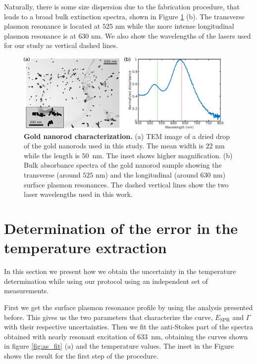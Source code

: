 \documentclass[journal=nalefd,manuscript=letter]{achemso}
\newcommand{\nm}{\ensuremath{\,\textrm{nm}}}
\begin{document}
Naturally, there is some size dispersion due to the fabrication procedure, that leads to a broad bulk extinction 
spectra, shown in Figure \ref{fg:nr-char} (b). The transverse plasmon resonance is located at 
$525$ nm while the more intense longitudinal plasmon resonance is at $630$ nm. We also show 
the wavelengths of the lasers used for our study as vertical dashed lines. 

\begin{figure}[htp] \centering
\includegraphics[width=0.95\textwidth]{Figures/Supplementary/07_GNRs_Characterization_TEM/GNRs_characterization.png}
\caption{\textbf{Gold nanorod characterization.} (a) TEM image of a dried drop of  the gold nanorods used in this study. The mean width is $22$ nm while the length is $50$ \nm. The inset shows higher magnification. (b) Bulk absorbance spectra of the gold nanorod sample showing the transverse (around $525$ nm) and the longitudinal (around $630$ nm) surface plasmon resonances. The dashed vertical lines show the two laser wavelengths used in this work.}
	\label{fg:nr-char}
\end{figure}


\pagebreak
\section{Determination of the error in the temperature extraction}\label{sec:discussion_errors} 

In this section we present how we obtain the uncertainty in the temperature determination
while using our protocol using an independent set of measurements.

First we get the surface plasmon resonance profile by using the analysis presented before.
This gives us the two parameters that characterize the curve, $E_\textrm{SPR}$ and $\Gamma$
with their respective uncertainties. Then we fit the anti-Stokes part of the spectra obtained with 
nearly resonant excitation of $633$ \nm, obtaining the curves shown in figure \ref{fig:as_fit} (a) and
the temperature values. The inset in the Figure shows the result for the first step of the procedure. 
\end{document}
